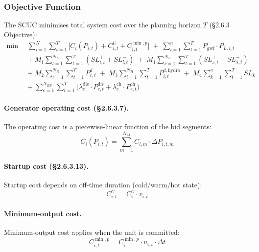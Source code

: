 \subsubsection{Objective Function}\label{sec:scuc-obj}

The SCUC minimises total system cost over the planning horizon $T$
(§2.6.3 Objective):
\begin{equation}\label{eq:scuc-obj}
\boxed{
\begin{aligned}
\min \;\; & \sum_{i=1}^{N}\sum_{t=1}^{T}
  \bigl[ C_i(P_{i,t}) + C^{U}_{i,t} + C^{\min,p}_{i,t} \bigr]
  \;+\; \sum_{i=1}^{n}\sum_{t=1}^{T} P_{\mathrm{gwf}} \cdot P_{L,i,t} \\
  &+\; M_1 \sum_{l=1}^{N_L}\sum_{t=1}^{T}(SL^{+}_{l,t}+SL^{-}_{l,t})
  \;+\; M_1 \sum_{s=1}^{N_S}\sum_{t=1}^{T}(SL^{+}_{s,t}+SL^{-}_{s,t}) \\
  &+\; M_2 \sum_{r=1}^{N_R}\sum_{t=1}^{T} P^{d}_{r,t}
  \;+\; M_3 \sum_{i=1}^{N_H}\sum_{t=1}^{T} P^{d,\mathrm{hydro}}_{i,t}
  \;+\; M_4 \sum_{k=1}^{a}\sum_{t=1}^{T} SL_k \\
  &+\; \sum_{e=1}^{N_{ES}}\sum_{t=1}^{T}
    \bigl(\lambda^{\mathrm{dis}}_e \cdot P^{\mathrm{dis}}_{e,t}
    + \lambda^{\mathrm{ch}}_e \cdot P^{\mathrm{ch}}_{e,t}\bigr)
\end{aligned}
}
\end{equation}

\paragraph{Generator operating cost (§2.6.3.7).}
The operating cost is a piecewise-linear function of the bid segments:
\begin{equation}\label{eq:gen-cost}
  C_i(P_{i,t}) = \sum_{m=1}^{N_M} C_{i,m} \cdot \Delta P_{i,t,m}
\end{equation}

\paragraph{Startup cost (§2.6.3.13).}
Startup cost depends on off-time duration (cold/warm/hot state):
\begin{equation}\label{eq:startup-cost}
  C^{U}_{i,t} = C^{U}_i \cdot v_{i,t}
\end{equation}

\paragraph{Minimum-output cost.}
Minimum-output cost applies when the unit is committed:
\begin{equation}\label{eq:noload-cost}
  C^{\min,p}_{i,t} = C^{\min,p}_i \cdot u_{i,t} \cdot \Delta t
\end{equation}

